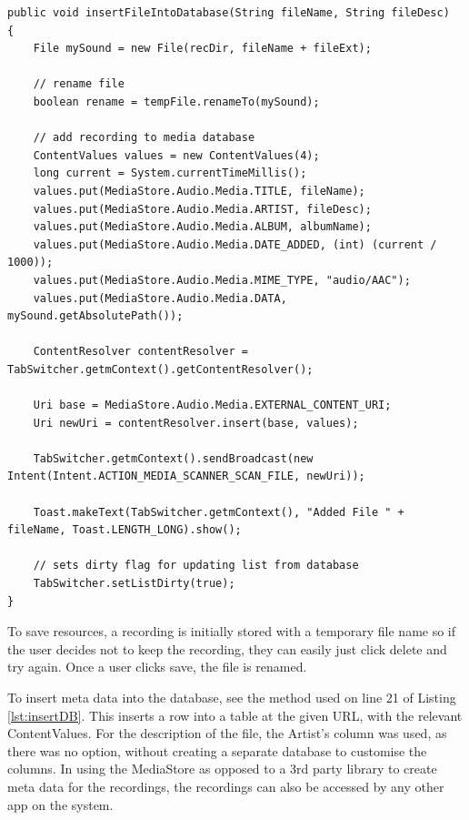 \documentclass[conference]{acmsiggraph}
\begin{document}

\begin{lstlisting}[label = {lst:insertDB}, caption={Inserting File into MediaStore Database}]
public void insertFileIntoDatabase(String fileName, String fileDesc)
{
    File mySound = new File(recDir, fileName + fileExt);
    	
    // rename file
    boolean rename = tempFile.renameTo(mySound);
    	
   	// add recording to media database
   	ContentValues values = new ContentValues(4);
   	long current = System.currentTimeMillis();
   	values.put(MediaStore.Audio.Media.TITLE, fileName);
   	values.put(MediaStore.Audio.Media.ARTIST, fileDesc);
   	values.put(MediaStore.Audio.Media.ALBUM, albumName);
   	values.put(MediaStore.Audio.Media.DATE_ADDED, (int) (current / 1000));
    values.put(MediaStore.Audio.Media.MIME_TYPE, "audio/AAC");
   	values.put(MediaStore.Audio.Media.DATA, mySound.getAbsolutePath());
    	
   	ContentResolver contentResolver = TabSwitcher.getmContext().getContentResolver();
    	
   	Uri base = MediaStore.Audio.Media.EXTERNAL_CONTENT_URI;
   	Uri newUri = contentResolver.insert(base, values);
    	
   	TabSwitcher.getmContext().sendBroadcast(new Intent(Intent.ACTION_MEDIA_SCANNER_SCAN_FILE, newUri));
   	
   	Toast.makeText(TabSwitcher.getmContext(), "Added File " + fileName, Toast.LENGTH_LONG).show();
    	
   	// sets dirty flag for updating list from database
   	TabSwitcher.setListDirty(true);
}
\end{lstlisting}

To save resources, a recording is initially stored with a temporary file name so if the user decides not to keep the recording, they can easily just click delete and try again. Once a user clicks save, the file is renamed.

To insert meta data into the database, see the method used on line 21 of Listing \ref{lst:insertDB}. This inserts a row into a table at the given URL, with the relevant ContentValues. For the description of the file, the Artist's column was used, as there was no option, without creating a separate database to customise the columns. In using the MediaStore as opposed to a 3rd party library to create meta data for the recordings, the recordings can also be accessed by any other app on the system.
\end{document}
